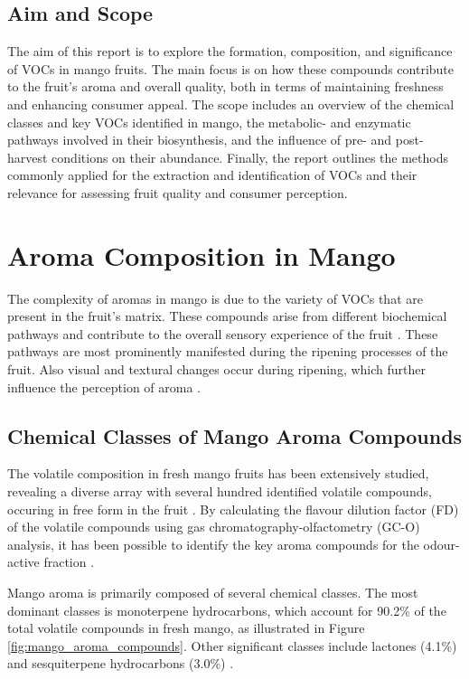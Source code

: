 \subsection{Aim and Scope}
The aim of this report is to explore the formation, composition, and significance of VOCs in mango fruits. The main focus is on how these compounds contribute to the fruit's aroma and overall quality, both in terms of maintaining freshness and enhancing consumer appeal.
The scope includes an overview of the chemical classes and key VOCs identified in mango, the metabolic- and enzymatic pathways involved in their biosynthesis, and the influence of pre- and post-harvest conditions on their abundance. Finally, the report outlines the methods commonly applied for the extraction and identification of VOCs and their relevance for assessing fruit quality and consumer perception.


\section{Aroma Composition in Mango}
The complexity of aromas in mango is due to the variety of VOCs that are present in the fruit's matrix. These compounds arise from different biochemical pathways and contribute to the overall sensory experience of the fruit \cite*{A05_Chin2019}. These pathways are most prominently manifested during the ripening processes of the fruit. Also visual and textural changes occur during ripening, which further influence the perception of aroma \cite*{A01_Aguirre-Lopez_2023, A05_Chin2019}.

\subsection{Chemical Classes of Mango Aroma Compounds}
The volatile composition in fresh mango fruits has been extensively studied, revealing a diverse array with several hundred identified volatile compounds, occuring in free form in the fruit \cite*{A07_Bonneau2016}. By calculating the flavour dilution factor (FD) of the volatile compounds using gas chromatography-olfactometry (GC-O) analysis, it has been possible to identify the key aroma compounds for the odour-active fraction \cite*{A07_Bonneau2016}.

Mango aroma is primarily composed of several chemical classes. The most dominant classes is monoterpene hydrocarbons, which account for 90.2\% of the total volatile compounds in fresh mango, as illustrated in Figure \ref{fig:mango_aroma_compounds}. Other significant classes include lactones (4.1\%) and sesquiterpene hydrocarbons (3.0\%) \cite*{A07_Bonneau2016}. 

